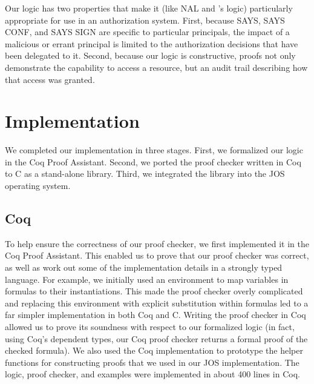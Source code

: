 \documentclass[10pt]{article}
\newcommand{\ruletext}[1]{{\scriptsize\textsf{#1}}}
\newcommand{\saysrule}{\ruletext{SAYS}}
\newcommand{\sayssignrule}{\ruletext{SAYS SIGN}}
\newcommand{\saysconfrule}{\ruletext{SAYS CONF}}
\begin{document}
\medskip
Our logic has two properties that make it (like NAL and \citet{Bauer}'s logic) particularly appropriate for use in an authorization system. First, because \saysrule{}, \saysconfrule{}, and \sayssignrule{} are specific to particular principals, the impact of a malicious or errant principal is limited to the authorization decisions that have been delegated to it.
Second, because our logic is constructive, proofs not only demonstrate the capability to access a resource, but an audit trail describing how that access was granted.

\section{Implementation}
\label{sec:impl}

We completed our implementation in three stages.  First, we formalized our logic in the Coq Proof Assistant.  Second, we ported the proof checker written in Coq to C as a stand-alone library.  Third, we integrated the library into the JOS operating system.

\subsection{Coq}
To help ensure the correctness of our proof checker, we first implemented it in the Coq Proof Assistant. This enabled us to prove that our proof checker was correct, as well as work out some of the implementation details in a strongly typed language.
For example, we initially used an environment to map variables in formulas to their instantiations. This made the proof checker overly complicated and replacing this environment with explicit substitution within formulas led to a far simpler implementation in both Coq and C.  Writing the proof checker in Coq allowed us to prove its soundness with respect to our formalized logic (in fact, using Coq's dependent types, our Coq proof checker returns a formal proof of the checked formula). We also used the Coq implementation to prototype the helper functions for constructing proofs that we used in our JOS implementation. The logic, proof checker, and examples were implemented in about 400 lines in Coq.
\end{document}
